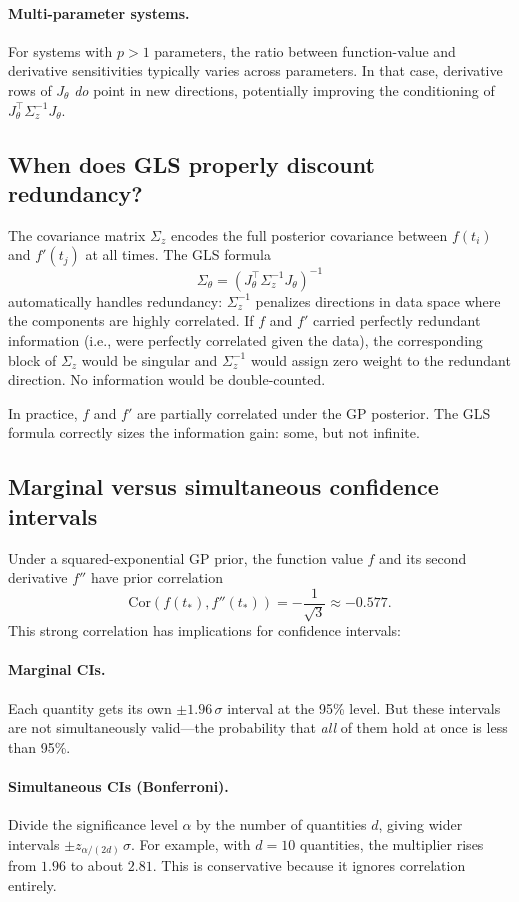 \documentclass[11pt]{article}
\begin{document}
\paragraph{Multi-parameter systems.}
For systems with $p>1$ parameters, the ratio between function-value and derivative sensitivities typically varies across parameters. In that case, derivative rows of $J_\theta$ \emph{do} point in new directions, potentially improving the conditioning of $J_\theta^\top \Sigma_z^{-1} J_\theta$.

\subsection*{When does GLS properly discount redundancy?}
The covariance matrix $\Sigma_z$ encodes the full posterior covariance between $f(t_i)$ and $f'(t_j)$ at all times. The GLS formula
\[
\Sigma_\theta = (J_\theta^\top \Sigma_z^{-1} J_\theta)^{-1}
\]
automatically handles redundancy: $\Sigma_z^{-1}$ penalizes directions in data space where the components are highly correlated. If $f$ and $f'$ carried perfectly redundant information (i.e., were perfectly correlated given the data), the corresponding block of $\Sigma_z$ would be singular and $\Sigma_z^{-1}$ would assign zero weight to the redundant direction. No information would be double-counted.

In practice, $f$ and $f'$ are partially correlated under the GP posterior. The GLS formula correctly sizes the information gain: some, but not infinite.

\subsection*{Marginal versus simultaneous confidence intervals}
Under a squared-exponential GP prior, the function value $f$ and its second derivative $f''$ have prior correlation
\[
\mathrm{Cor}(f(t_*),f''(t_*)) = -\frac{1}{\sqrt{3}} \approx -0.577.
\]
This strong correlation has implications for confidence intervals:

\paragraph{Marginal CIs.}
Each quantity gets its own $\pm 1.96\,\sigma$ interval at the 95\% level. But these intervals are not simultaneously valid---the probability that \emph{all} of them hold at once is less than 95\%.

\paragraph{Simultaneous CIs (Bonferroni).}
Divide the significance level $\alpha$ by the number of quantities $d$, giving wider intervals $\pm z_{\alpha/(2d)}\,\sigma$. For example, with $d=10$ quantities, the multiplier rises from $1.96$ to about $2.81$. This is conservative because it ignores correlation entirely.
\end{document}
